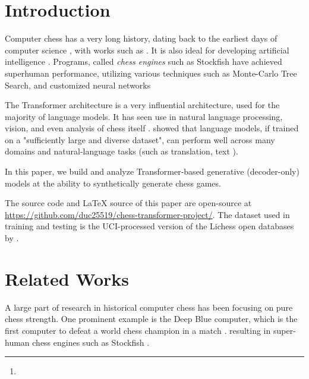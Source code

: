 \documentclass[11pt, a4paper]{article}
\title{\papertitle}
\author{\paperauthor \thanks{\paperauthoremail}}
\date{\today}
\begin{document}
\maketitle

\begin{abstract}
    In this paper, we analyze whether decoder-only Transformer models can generate complete (terminated) and valid (no illegal moves or positions) chess games by watching movement of pieces.
\end{abstract}

\section{Introduction}

Computer chess has a very long history, dating back to the earliest days of computer science \citep{silver-2017}, with works such as \citet{shannon-1950}. It is also ideal for developing artificial intelligence \citep{tang-2024, toshniwal-2022}. Programs, called \textit{chess engines} such as Stockfish \citep{thestockfishdevelopers-2026} have achieved superhuman performance, utilizing various techniques such as Monte-Carlo Tree Search, and customized neural networks

The Transformer architecture \citep{vaswani-2017} is a very influential architecture, used for the majority of language models. It has seen use in natural language processing, vision, and even analysis of chess itself \citep{ruoss-2024,monroe-2024}. \citet{radford-2019} showed that language models, if trained on a "sufficiently large and diverse dataset", can perform well across many domains and natural-language tasks (such as translation, text ).

In this paper, we build and analyze Transformer-based generative (decoder-only) models at the ability to synthetically generate chess games.

The source code and \LaTeX{} source of this paper are open-source at \url{https://github.com/duc25519/chess-transformer-project/}. The dataset used in training and testing is the UCI-processed version of the Lichess open databases by \citet{davis-2024}.


\section{Related Works}

A large part of research in historical computer chess has been focusing on pure chess strength. One prominent example is the Deep Blue computer, which is the first computer to defeat a world chess champion in a match \citep{campbell-2002}. resulting in super-human chess engines such as Stockfish \citep{thestockfishdevelopers-2026}.
\end{document}
